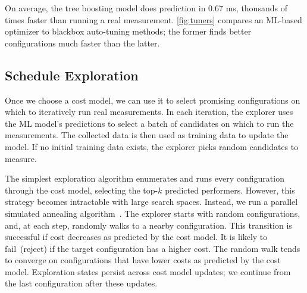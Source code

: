 \documentclass[letterpaper,twocolumn,10pt]{article}
\newcommand{\precap}{\vskip -0mm}
\newcommand{\postcap}{\vskip -0mm}
\newcommand{\TensorOpt}{TVM\xspace}
\begin{document}
On average, the tree boosting model does prediction in 0.67 ms, thousands of times faster than running a real measurement. \autoref{fig:tuners} compares an ML-based optimizer to blackbox auto-tuning methods; the former finds better configurations much faster than the latter.




\subsection{Schedule Exploration}
Once we choose a cost model, we can use it to select promising configurations on which to iteratively run real measurements.
In each iteration, the explorer uses the ML model's predictions to select a batch of candidates on which to run the measurements.
The collected data is then used as training data to update the model.
If no initial training data exists, the explorer picks random candidates to measure.

The simplest exploration algorithm enumerates and runs every configuration through the cost model, selecting the top-$k$ predicted performers.
However, this strategy becomes intractable with large search spaces.
Instead, we run a parallel simulated annealing algorithm~\cite{SimulatedAnealing}.
The explorer starts with random configurations, and, at each step, randomly walks to a nearby configuration.
This transition is successful if cost decreases as predicted by the cost model. It is likely to
fail~(reject) if the target configuration has a higher cost.
The random walk tends to converge on configurations that have lower costs as predicted by the cost model.
Exploration states persist across cost model updates; we continue from the last configuration after these updates.


\end{document}
